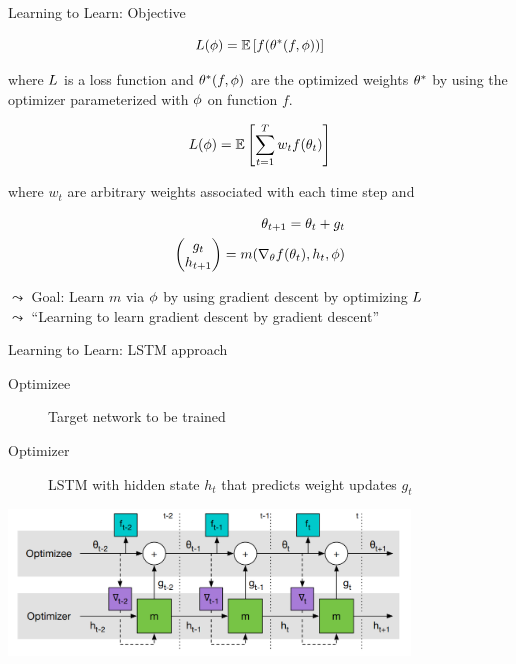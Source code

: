 \begin{frame}[c]{Learning to Learn: Objective }

\vspace{-0.5cm}
\begin{equation}
L(\phi) = \mathbb{E}\left[ f(\theta^*(f,\phi)) \right]\nonumber
\end{equation}

where $L$ is a loss function and $\theta^*(f,\phi)$ are the optimized weights $\theta^*$ by using the optimizer parameterized with $\phi$ on function $f$.

\pause

\begin{equation}
L(\phi) = \mathbb{E}\left[\sum_{t=1}^T w_t f(\theta_t)\right]\nonumber
\end{equation}

\pause
where $w_t$ are arbitrary weights associated with each time step
and 

\pause
\vspace{-0.5cm}
\begin{eqnarray}
\theta_{t+1} = \theta_t + g_t\nonumber\\
\begin{pmatrix}g_t\\h_{t+1}\end{pmatrix} = m(\nabla_\theta f(\theta_t), h_t, \phi)\nonumber
\end{eqnarray}

\pause
$\leadsto$ Goal: Learn $m$ via $\phi$ by using gradient descent by optimizing $L$ \\
\pause
$\leadsto$ ``Learning to learn gradient descent by gradient descent''
\end{frame}
\begin{frame}[c]{Learning to Learn: LSTM approach }

\begin{description}
\item[Optimizee] Target network to be trained
\item[Optimizer] LSTM with hidden state $h_t$ that predicts weight updates $g_t$
\end{description}

\medskip

\centering
\includegraphics[width=0.8\textwidth]{images/learning_to_learn_lstm}

\end{frame}
